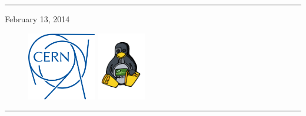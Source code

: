 \begin{titlepage}

\vspace*{3cm}


\noindent \rule{\textwidth}{.1cm}

\hfill February 13, 2014

\vspace*{3cm}

\begin{figure}[h]
  \includegraphics[height=3cm]{fig/cern-logo}
  \hfill
  \includegraphics[height=3cm]{fig/ohwr-logo}
\end{figure}

\vfill


\noindent \rule{\textwidth}{.05cm}

\end{titlepage}
